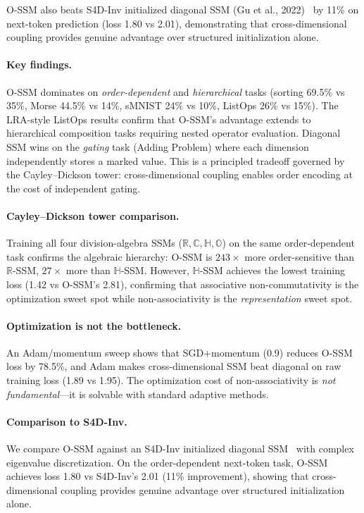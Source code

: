 \documentclass{article}
\newcommand{\Oct}{\mathbb{O}}
\newcommand{\R}{\mathbb{R}}
\newcommand{\C}{\mathbb{C}}
\newcommand{\HH}{\mathbb{H}}
\begin{document}
O-SSM also beats S4D-Inv initialized diagonal SSM (Gu et al., 2022)~\cite{gu2022efficiently} by 11\% on next-token prediction (loss 1.80 vs 2.01), demonstrating that cross-dimensional coupling provides genuine advantage over structured initialization alone.

\paragraph{Key findings.}
O-SSM dominates on \emph{order-dependent} and \emph{hierarchical} tasks (sorting 69.5\% vs 35\%, Morse 44.5\% vs 14\%, sMNIST 24\% vs 10\%, ListOps 26\% vs 15\%).
The LRA-style ListOps results confirm that O-SSM's advantage extends to hierarchical composition tasks requiring nested operator evaluation.
Diagonal SSM wins on the \emph{gating} task (Adding Problem) where each dimension independently stores a marked value.
This is a principled tradeoff governed by the Cayley--Dickson tower: cross-dimensional coupling enables order encoding at the cost of independent gating.

\paragraph{Cayley--Dickson tower comparison.}
Training all four division-algebra SSMs ($\R, \C, \HH, \Oct$) on the same order-dependent task confirms the algebraic hierarchy:
O-SSM is $243\times$ more order-sensitive than $\R$-SSM, $27\times$ more than $\HH$-SSM.
However, $\HH$-SSM achieves the lowest training loss (1.42 vs O-SSM's 2.81), confirming that associative non-commutativity is the optimization sweet spot while non-associativity is the \emph{representation} sweet spot.

\paragraph{Optimization is not the bottleneck.}
An Adam/momentum sweep shows that SGD+momentum (0.9) reduces O-SSM loss by 78.5\%, and Adam makes cross-dimensional SSM beat diagonal on raw training loss (1.89 vs 1.95). The optimization cost of non-associativity is \emph{not fundamental}---it is solvable with standard adaptive methods.

\paragraph{Comparison to S4D-Inv.}
We compare O-SSM against an S4D-Inv initialized diagonal SSM~\cite{gu2022efficiently} with complex eigenvalue discretization.
On the order-dependent next-token task, O-SSM achieves loss 1.80 vs S4D-Inv's 2.01 (11\% improvement), showing that cross-dimensional coupling provides genuine advantage over structured initialization alone.
\end{document}
